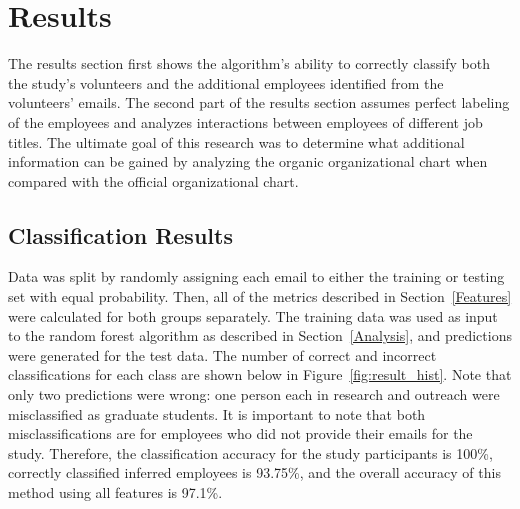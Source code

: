 \documentclass[10pt,twocolumn,conference]{IEEEtran}
\begin{document}
\section{Results} \label{Results}

The results section first shows the algorithm's ability to correctly classify both the study's volunteers and the additional employees identified from the volunteers' emails.  The second part of the results section assumes perfect labeling of the employees and analyzes interactions between employees of different job titles.  The ultimate goal of this research was to determine what additional information can be gained by analyzing the organic organizational chart when compared with the official organizational chart.

\subsection{Classification Results}
Data was split by randomly assigning each email to either the training or testing set with equal probability.  Then, all of the metrics described in Section~\ref{Features} were calculated for both groups separately.  The training data was used as input to the random forest algorithm as described in Section~\ref{Analysis}, and predictions were generated for the test data.  The number of correct and incorrect classifications for each class are shown below in Figure~\ref{fig:result_hist}.  Note that only two predictions were wrong: one person each in research and outreach were misclassified as graduate students.  It is important to note that both  misclassifications are for employees who did not provide their emails for the study.  Therefore, the classification accuracy for the study participants is 100\%, correctly classified inferred employees is 93.75\%, and the overall accuracy of this method using all features is 97.1\%.
\end{document}
